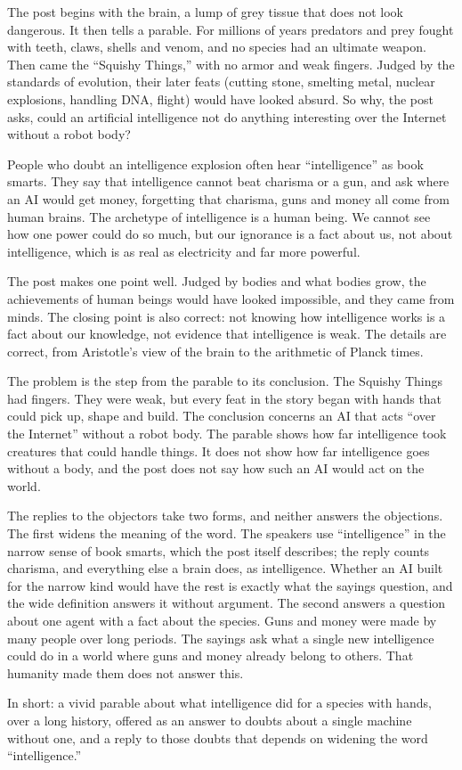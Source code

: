 \begin{afterword}
\summaryhead

The post begins with the brain, a lump of grey tissue that does not look dangerous. It then tells a parable. For millions of years predators and prey fought with teeth, claws, shells and venom, and no species had an ultimate weapon. Then came the ``Squishy Things,'' with no armor and weak fingers. Judged by the standards of evolution, their later feats (cutting stone, smelting metal, nuclear explosions, handling DNA, flight) would have looked absurd. So why, the post asks, could an artificial intelligence not do anything interesting over the Internet without a robot body?

People who doubt an intelligence explosion often hear ``intelligence'' as book smarts. They say that intelligence cannot beat charisma or a gun, and ask where an AI would get money, forgetting that charisma, guns and money all come from human brains. The archetype of intelligence is a human being. We cannot see how one power could do so much, but our ignorance is a fact about us, not about intelligence, which is as real as electricity and far more powerful.

\responsehead

The post makes one point well. Judged by bodies and what bodies grow, the achievements of human beings would have looked impossible, and they came from minds. The closing point is also correct: not knowing how intelligence works is a fact about our knowledge, not evidence that intelligence is weak. The details are correct, from Aristotle's view of the brain to the arithmetic of Planck times.

The problem is the step from the parable to its conclusion. The Squishy Things had fingers. They were weak, but every feat in the story began with hands that could pick up, shape and build. The conclusion concerns an AI that acts ``over the Internet'' without a robot body. The parable shows how far intelligence took creatures that could handle things. It does not show how far intelligence goes without a body, and the post does not say how such an AI would act on the world.

The replies to the objectors take two forms, and neither answers the objections. The first widens the meaning of the word. The speakers use ``intelligence'' in the narrow sense of book smarts, which the post itself describes; the reply counts charisma, and everything else a brain does, as intelligence. Whether an AI built for the narrow kind would have the rest is exactly what the sayings question, and the wide definition answers it without argument. The second answers a question about one agent with a fact about the species. Guns and money were made by many people over long periods. The sayings ask what a single new intelligence could do in a world where guns and money already belong to others. That humanity made them does not answer this.

In short: a vivid parable about what intelligence did for a species with hands, over a long history, offered as an answer to doubts about a single machine without one, and a reply to those doubts that depends on widening the word ``intelligence.''
\end{afterword}
